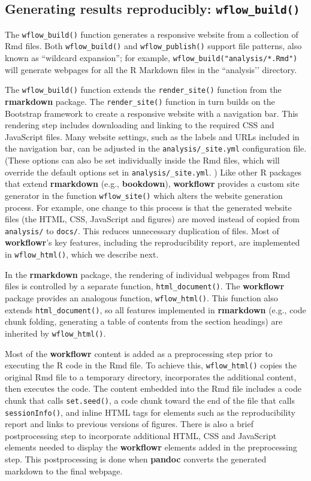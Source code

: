 \documentclass[9pt,a4paper]{extarticle}
\begin{document}
\subsection*{Generating results reproducibly: \texttt{wflow\_build()}}

The \texttt{wflow\_build()} function generates a responsive website from a
collection of Rmd files. Both \texttt{wflow\_build()} and \texttt{wflow\_publish()} support
file patterns, also known as “wildcard expansion”; for example,
\texttt{wflow\_build("analysis/*.Rmd")} will generate webpages for all
the R Markdown files in the ``analysis’’ directory.

The \texttt{wflow\_build()} function extends the \texttt{render\_site()} function from the
 \textbf{rmarkdown} package. The \texttt{render\_site()} function in turn builds on the
Bootstrap framework to create a responsive website with a navigation
bar. This rendering step includes downloading and linking to the
required CSS and JavaScript files. Many website settings, such as the
labels and URLs included in the navigation bar, can be adjusted in the
\verb|analysis/_site.yml| configuration file. (These options can also be
set individually inside the Rmd files, which will override the default
options set in \texttt{analysis/\_site.yml}. ) Like other R packages
that extend \textbf{rmarkdown} (e.g., \textbf{bookdown}), \textbf{workflowr} provides a custom site
generator in the function \texttt{wflow\_site()} which alters the website
generation process. For example, one change to this process is that the
generated website files (the HTML, CSS, JavaScript and figures) are
moved instead of copied from \verb|analysis/| to \verb|docs/|. This
reduces unnecessary duplication of files. Most of \textbf{workflowr}’s key
features, including the reproducibility report, are implemented in
\texttt{wflow\_html()}, which we describe next.

In the \textbf{rmarkdown} package, the rendering of individual webpages from Rmd
files is controlled by a separate function, \texttt{html\_document()}. The
 \textbf{workflowr} package provides an analogous function, \texttt{wflow\_html()}. This
function also extends \texttt{html\_document()}, so all features implemented in
 \textbf{rmarkdown} (e.g., code chunk folding, generating a table of contents from
the section headings) are inherited by \texttt{wflow\_html()}.

Most of the \textbf{workflowr} content is added as a preprocessing step prior to
executing the R code in the Rmd file. To achieve this, \texttt{wflow\_html()}
copies the original Rmd file to a temporary directory, incorporates the
additional content, then executes the code. The content embedded into
the Rmd file includes a code chunk that calls \texttt{set.seed()}, a code chunk
toward the end of the file that calls \texttt{sessionInfo()}, and inline HTML
tags for elements such as the reproducibility report and links to
previous versions of figures. There is also a brief postprocessing step
to incorporate additional HTML, CSS and JavaScript elements needed to
display the \textbf{workflowr} elements added in the preprocessing step. This
postprocessing is done when \textbf{pandoc} converts the generated markdown to
the final webpage.
\end{document}
